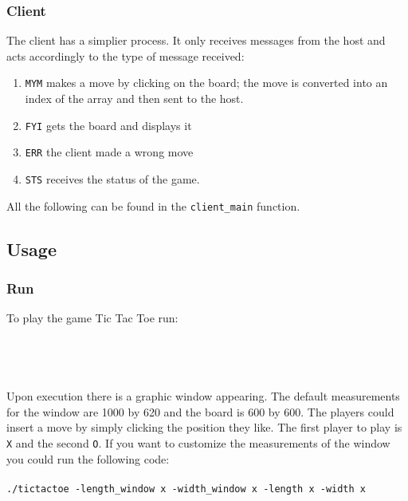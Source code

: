 \documentclass[10pt,a4paper]{article}
\begin{document}
\subsubsection{Client }
The client has a simplier process. It only receives messages from the host and acts accordingly to the type of message received:
\begin{enumerate}
\item \texttt{MYM} makes a move by clicking on the board; the move is converted into an index of the array and then sent to the host.
\item \texttt{FYI} gets the board and displays it
\item \texttt{ERR} the client made a wrong move
\item \texttt{STS} receives the status of the game. 
\end{enumerate}
All the following can be found in the \texttt{client\_main} function.
\subsection{Usage}
\subsubsection{Run}
To play the game Tic Tac Toe run:\\\\
\\
\\\\
Upon execution there is a graphic window appearing. The default measurements for the window are 1000 by 620 and the board is 600 by 600. The players could insert a move by simply clicking the position they like. The first player to play is \texttt{X} and the second \texttt{O}. If you want to customize the measurements of the window you could run the following code:\\\\
\texttt{./tictactoe -length\_window x -width\_window x -length x -width x}
  

  
\end{document}

